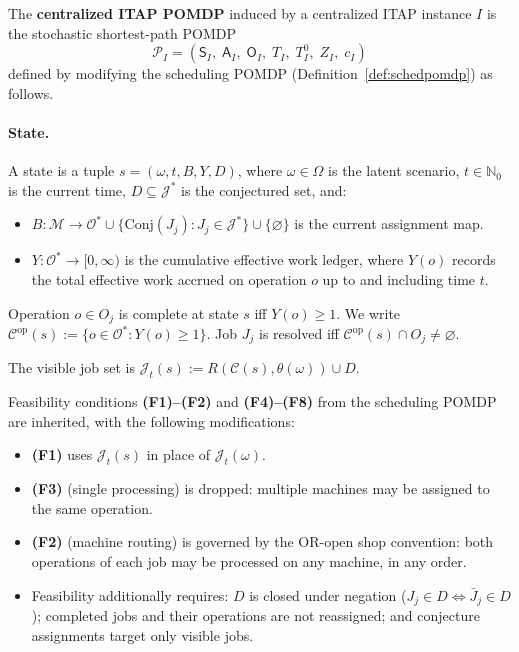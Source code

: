 \begin{definition}\label{def:citappomdp}
The \textbf{centralized ITAP POMDP} induced by a centralized ITAP instance $I$ is
the stochastic shortest-path POMDP
\[
\mathcal{P}_I = (\mathsf{S}_I,\; \mathsf{A}_I,\; \mathsf{O}_I,\; T_I,\; T_I^0,\;
Z_I,\; c_I)
\]
defined by modifying the scheduling POMDP (Definition~\ref{def:schedpomdp}) as
follows.
\end{definition}

\paragraph{State.} A state is a tuple $s = (\omega, t, B, Y, D)$, where
$\omega \in \Omega$ is the latent scenario, $t \in \mathbb{N}_0$ is the current time,
$D \subseteq \mathcal{J}^*$ is the conjectured set, and:
\begin{itemize}
    \item $B : \mathcal{M} \to \mathcal{O}^* \cup
    \{\mathrm{Conj}(J_j) : J_j \in \mathcal{J}^*\} \cup \{\varnothing\}$
    is the current assignment map.
    \item $Y : \mathcal{O}^* \to [0, \infty)$ is the cumulative effective work
    ledger, where $Y(o)$ records the total effective work accrued on operation $o$
    up to and including time $t$.
\end{itemize}

Operation $o \in O_j$ is complete at state $s$ iff $Y(o) \ge 1$. We write
$\mathcal{C}^{\mathrm{op}}(s) := \{o \in \mathcal{O}^* : Y(o) \ge 1\}$.
Job $J_j$ is resolved iff
$\mathcal{C}^{\mathrm{op}}(s) \cap O_j \neq \varnothing$.


The visible job set is
$\mathcal{J}_t(s) := R(\mathcal{C}(s), \theta(\omega)) \cup D$.

Feasibility conditions \textbf{(F1)--(F2)} and \textbf{(F4)--(F8)} from the
scheduling POMDP are inherited, with the following modifications:
\begin{itemize}
    \item \textbf{(F1)} uses $\mathcal{J}_t(s)$ in place of
    $\mathcal{J}_t(\omega)$.
    \item \textbf{(F3)} (single processing) is dropped: multiple machines may be
    assigned to the same operation.
    \item \textbf{(F2)} (machine routing) is governed by the OR-open shop
    convention: both operations of each job may be processed on any machine, in any
    order.
    \item Feasibility additionally requires: $D$ is closed under negation
    ($J_j \in D \iff \bar J_j \in D$); completed jobs and their operations are not
    reassigned; and conjecture assignments target only visible jobs.
\end{itemize}

